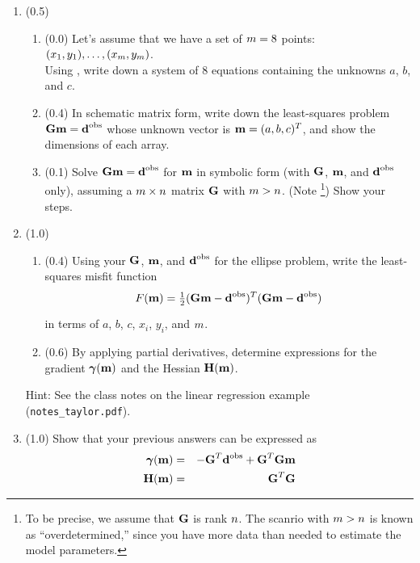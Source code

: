 \documentclass[11pt,titlepage,fleqn]{article}
\begin{document}
\begin{enumerate}
\item (0.5) 

\begin{enumerate}
\item (0.0) Let's assume that we have a set of $m=8$ points: $(x_1,y_1), \ldots, (x_{m},y_{m})$. \\
Using , write down a system of 8 equations containing the unknowns $a$, $b$, and $c$.

\item  (0.4) In schematic matrix form, write down the least-squares problem $\mbox{${\bf G}$}\mbox{${\bf m}$}=\mbox{${\bf d}$}^{\rm obs}$ whose unknown vector is $\mbox{${\bf m}$} = (a,b,c)^T$, and show the dimensions of each array.

\item (0.1) Solve $\mbox{${\bf G}$}\mbox{${\bf m}$}=\mbox{${\bf d}$}^{\rm obs}$ for $\mbox{${\bf m}$}$ in symbolic form (\ie with $\mbox{${\bf G}$}$, $\mbox{${\bf m}$}$, and $\mbox{${\bf d}$}^{\rm obs}$ only), assuming a $m \times n$ matrix $\mbox{${\bf G}$}$ with $m > n$. (Note \footnote{To be precise, we assume that $\mbox{${\bf G}$}$ is rank $n$. The scanrio with $m > n$ is known as ``overdetermined,'' since you have more data than needed to estimate the model parameters.}) Show your steps.
\end{enumerate}


\item (1.0) 
\begin{enumerate}
\item (0.4) Using your $\mbox{${\bf G}$}$, $\mbox{${\bf m}$}$, and $\mbox{${\bf d}$}^{\rm obs}$ for the ellipse problem, write the least-squares misfit function
%
\begin{equation}
F(\bem) = \hlf (\bG\bem - \dvec)^T(\bG\bem - \dvec)
\end{equation}
%
in terms of $a$, $b$, $c$, $x_i$, $y_i$, and $m$.

\item (0.6) By applying partial derivatives, determine expressions for the gradient $\mbox{\boldmath $\bf \gamma$}(\mbox{${\bf m}$})$ and the Hessian $\mbox{${\bf H}$}(\mbox{${\bf m}$})$.

\end{enumerate}

Hint: See the class notes on the linear regression example (\verb+notes_taylor.pdf+).


\item (1.0) Show that your previous answers can be expressed as
%
\begin{eqnarray}
\mbox{\boldmath $\bf \gamma$}(\mbox{${\bf m}$}) &=& -\mbox{${\bf G}$}^T\mbox{${\bf d}$}^{\rm obs} + \mbox{${\bf G}$}^T\mbox{${\bf G}$}\mbox{${\bf m}$}
\\
\mbox{${\bf H}$}(\mbox{${\bf m}$}) &=& \mbox{${\bf G}$}^T\mbox{${\bf G}$}
\end{eqnarray}


\end{enumerate}
\end{document}
